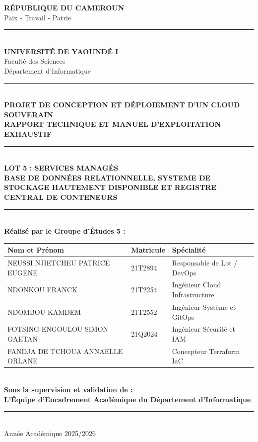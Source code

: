 \documentclass[12pt,a4paper]{article}
\begin{document}
\begin{titlepage}
    \centering
    \vspace*{0.5cm}
    {\large \bfseries RÉPUBLIQUE DU CAMEROUN}\\[0.1cm]
    {\small Paix - Travail - Patrie}\\[0.1cm]
    \rule{3cm}{0.5pt}\\[0.2cm]
    {\large \bfseries UNIVERSITÉ DE YAOUNDÉ I}\\[0.1cm]
    {\small Faculté des Sciences}\\[0.1cm]
    {\small Département d'Informatique}\\[0.2cm]
    \rule{6cm}{1pt}\\[1cm]
    
    {\large \bfseries PROJET DE CONCEPTION ET DÉPLOIEMENT D'UN CLOUD SOUVERAIN}\\[0.3cm]
    {\Large \bfseries RAPPORT TECHNIQUE ET MANUEL D'EXPLOITATION EXHAUSTIF}\\[0.5cm]
    \rule{\linewidth}{1.5pt}\\[0.4cm]
    {\Large \bfseries LOT 5 : SERVICES MANAGÉS}\\[0.3cm]
    {\large \bfseries BASE DE DONNÉES RELATIONNELLE, SYSTEME DE STOCKAGE HAUTEMENT DISPONIBLE ET REGISTRE CENTRAL DE CONTENEURS}\\[0.4cm]
    \rule{\linewidth}{1.5pt}\\[1cm]
    
    {\large \bfseries Réalisé par le Groupe d'Études 5 :}\\[0.4cm]
    \begin{tabular}{lll}
        \textbf{Nom et Prénom} & \textbf{Matricule} & \textbf{Spécialité} \\
        \midrule
        NEUSSI NJIETCHEU PATRICE EUGENE & 21T2894 & Responsable de Lot / DevOps \\
        NDONKOU FRANCK & 21T2254 & Ingénieur Cloud Infrastructure \\
        NDOMBOU KAMDEM & 21T2552 & Ingénieur Système et GitOps \\
        FOTSING ENGOULOU SIMON GAETAN & 21Q2024 & Ingénieur Sécurité et IAM \\
        FANDJA DE TCHOUA ANNAELLE ORLANE & & Concepteur Terraform IaC \\
    \end{tabular}\\[1.2cm]
    
    {\large \bfseries Sous la supervision et validation de :}\\[0.2cm]
    {\large \bfseries L'Équipe d'Encadrement Académique du Département d'Informatique}\\[1.5cm]
    
    \vfill
    \rule{8cm}{0.5pt}\\[0.2cm]
    {\large Année Académique 2025/2026}
\end{titlepage}
\end{document}
